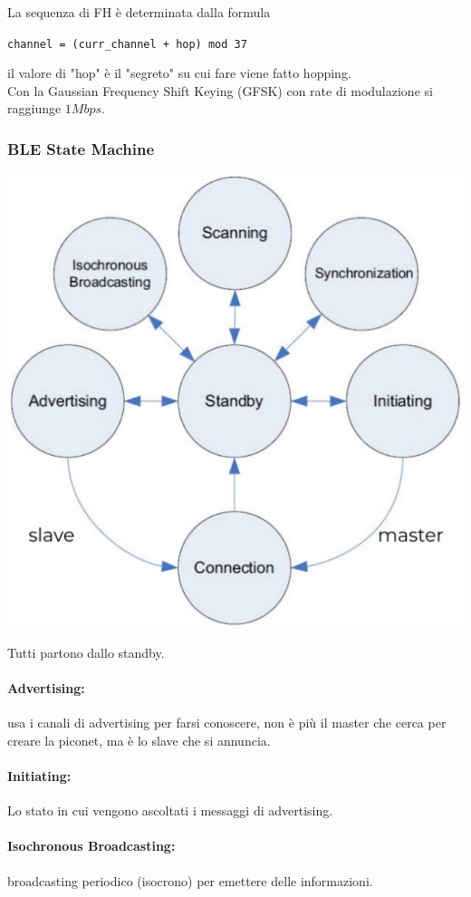 La sequenza di FH è determinata dalla formula
\begin{center}
	\texttt{channel = (curr\_channel + hop) mod 37}
\end{center}
il valore di "hop" è il "segreto" su cui fare viene fatto hopping. \\ 

Con la Gaussian Frequency Shift Keying (GFSK) con rate di modulazione si raggiunge $1Mbps$.\\

\subsubsection{BLE State Machine}
\begin{center}
	\includegraphics[width=0.6\linewidth]{img/wpan/blestate}
\end{center}
Tutti partono dallo standby.\\

\paragraph{Advertising:} usa i canali di advertising per farsi conoscere, non è più il master che cerca per creare la piconet, ma è lo slave che si annuncia. \\

\paragraph{Initiating:} Lo stato in cui vengono ascoltati i messaggi di advertising.\\

\paragraph{Isochronous Broadcasting:} broadcasting periodico (isocrono) per emettere delle informazioni.\\

